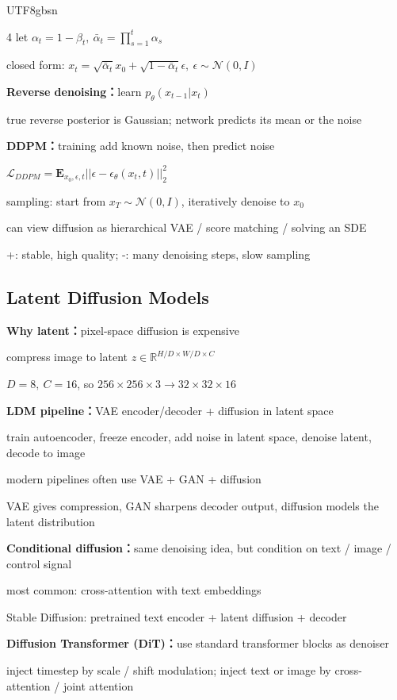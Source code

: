 \documentclass[8pt,a4paper]{extarticle}
\newcommand{\entry}[1]{\vspace{3pt}\noindent\textbf{#1：}}
\begin{document}
\begin{CJK*}{UTF8}{gbsn}
\begin{multicols*}{4}
let $\alpha_t = 1-\beta_t,\ \bar{\alpha}_t = \prod_{s=1}^t \alpha_s$

closed form: $x_t = \sqrt{\bar{\alpha}_t}x_0 + \sqrt{1-\bar{\alpha}_t}\epsilon,\ \epsilon\sim\mathcal{N}(0,I)$

\entry{Reverse denoising}learn $p_\theta(x_{t-1}|x_t)$

true reverse posterior is Gaussian; network predicts its mean or the noise

\entry{DDPM}training add known noise, then predict noise

$\mathcal{L}_{DDPM} = \mathbf{E}_{x_0,\epsilon,t} ||\epsilon-\epsilon_\theta(x_t,t)||_2^2$

sampling: start from $x_T \sim \mathcal{N}(0,I)$, iteratively denoise to $x_0$

can view diffusion as hierarchical VAE / score matching / solving an SDE

+: stable, high quality; -: many denoising steps, slow sampling

\subsection*{Latent Diffusion Models}

\entry{Why latent}pixel-space diffusion is expensive

compress image to latent $z \in \mathbb{R}^{H/D \times W/D \times C}$

$D=8,\ C=16$, so $256\times256\times3 \rightarrow 32\times32\times16$

\entry{LDM pipeline}VAE encoder/decoder + diffusion in latent space

train autoencoder, freeze encoder, add noise in latent space, denoise latent, decode to image

modern pipelines often use VAE + GAN + diffusion

VAE gives compression, GAN sharpens decoder output, diffusion models the latent distribution

\entry{Conditional diffusion}same denoising idea, but condition on text / image / control signal

most common: cross-attention with text embeddings

Stable Diffusion: pretrained text encoder + latent diffusion + decoder

\entry{Diffusion Transformer (DiT)}use standard transformer blocks as denoiser

inject timestep by scale / shift modulation; inject text or image by cross-attention / joint attention


\end{multicols*}
\end{CJK*}
\end{document}
